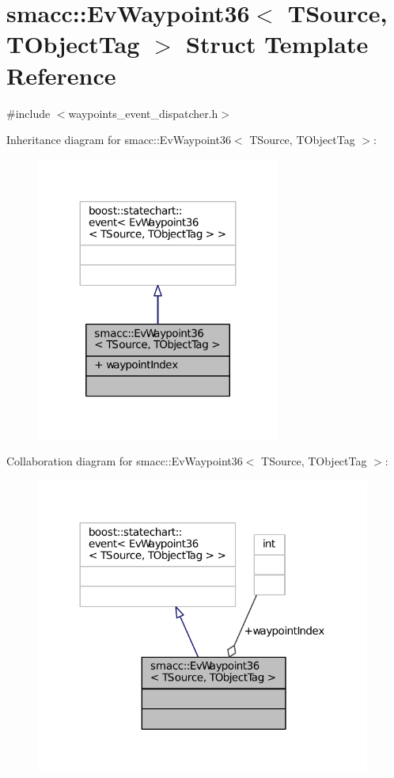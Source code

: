 \hypertarget{structsmacc_1_1EvWaypoint36}{}\section{smacc\+:\+:Ev\+Waypoint36$<$ T\+Source, T\+Object\+Tag $>$ Struct Template Reference}
\label{structsmacc_1_1EvWaypoint36}


{\ttfamily \#include $<$waypoints\+\_\+event\+\_\+dispatcher.\+h$>$}



Inheritance diagram for smacc\+:\+:Ev\+Waypoint36$<$ T\+Source, T\+Object\+Tag $>$\+:
\nopagebreak
\begin{figure}[H]
\begin{center}
\leavevmode
\includegraphics[width=227pt]{structsmacc_1_1EvWaypoint36__inherit__graph}
\end{center}
\end{figure}


Collaboration diagram for smacc\+:\+:Ev\+Waypoint36$<$ T\+Source, T\+Object\+Tag $>$\+:
\nopagebreak
\begin{figure}[H]
\begin{center}
\leavevmode
\includegraphics[width=312pt]{structsmacc_1_1EvWaypoint36__coll__graph}
\end{center}
\end{figure}
